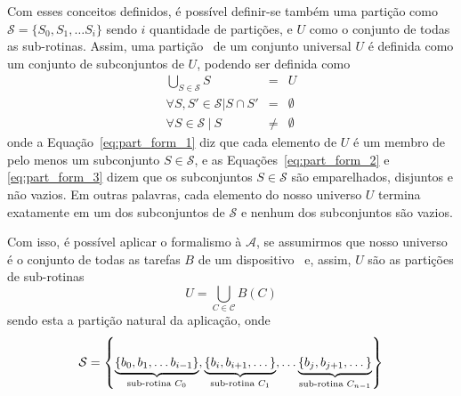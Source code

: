         
        
        Com esses conceitos definidos, é possível definir-se também uma partição como $ \mathcal{S} = \{S_0, S_1, \dots S_i\} $ sendo $ i $ quantidade de partições, e $U$ como o conjunto de todas as sub-rotinas.
        Assim, uma partição \Ss\ de um conjunto universal $ U $ é definida como um conjunto de subconjuntos de $ U $, podendo ser definida como
        \begin{eqnarray}
        \bigcup_{S \in \mathcal{S}} S &=& U           \label{eq:part_form_1} \\
        \forall S, S' \in \mathcal{S} | S \cap S' &=& \emptyset  \label{eq:part_form_2}\\
        \forall S \in \mathcal{S}\ |\ S &\neq& \emptyset  \label{eq:part_form_3}
        \end{eqnarray}
        onde a Equação~\ref{eq:part_form_1} diz que cada elemento de $ U $ é um membro de pelo menos um subconjunto $ S \in \mathcal{S} $, e as Equações~\ref{eq:part_form_2} e \ref{eq:part_form_3} dizem que os subconjuntos $ S \in \mathcal{S} $ são emparelhados, disjuntos e não vazios.
        Em outras palavras, cada elemento do nosso universo $ U $ termina exatamente em um dos subconjuntos de $\mathcal{S}$ e nenhum dos subconjuntos são vazios.
        
        Com isso, é possível aplicar o formalismo à $ \mathcal{A} $, se assumirmos que nosso universo é o conjunto de todas as tarefas $B$ de um dispositivo \wearable\ e, assim, $U$ são as partições de sub-rotinas
        \begin{equation}
        U = \bigcup_{C \in \mathcal{C}} B(C) \label{eq:bigcup}
        \end{equation}
        sendo esta a partição natural da aplicação, onde
        \begin{equation} \small
        \mathcal{S}  = \left \{
        \underbrace{\left \{ b_0, b_1, \dots b_{i-1} \right \}}_{\textnormal{sub-rotina }C_0},
        \underbrace{\left \{ b_i, b_{i+1}, \dots \right \}}_{\textnormal{sub-rotina }C_1},\dots
        \underbrace{\left \{ b_j, b_{j+1}, \dots \right \}}_{\textnormal{sub-rotina }C_{n-1}}
        \right \}
        \end{equation}
        
